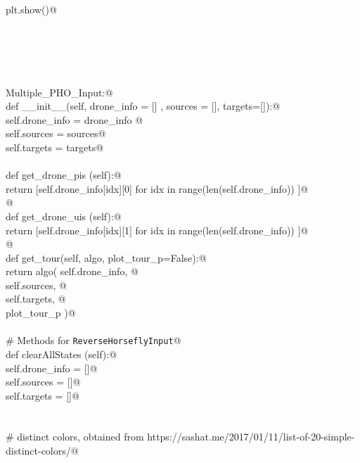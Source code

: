 \documentclass[10pt, english, oneside]{report}
\begin{document}
\begin{appendices}
\begin{flushleft}
\begin{list}{}{}
\mbox{}\verb@    plt.show()@\\
\mbox{}\verb@@\\
\mbox{}\verb@@\\
\mbox{}\verb@@\\
\mbox{}\verb@@\\
\mbox{}\verb@@\\
\mbox{}\verb@class Multiple_PHO_Input:@\\
\mbox{}\verb@    def __init__(self, drone_info = [] , sources = [], targets=[]):@\\
\mbox{}\verb@           self.drone_info = drone_info @\\
\mbox{}\verb@           self.sources     = sources@\\
\mbox{}\verb@           self.targets     = targets@\\
\mbox{}\verb@@\\
\mbox{}\verb@    def get_drone_pis (self):@\\
\mbox{}\verb@           return [self.drone_info[idx][0] for idx in range(len(self.drone_info)) ]@\\
\mbox{}\verb@           @\\
\mbox{}\verb@    def get_drone_uis (self):@\\
\mbox{}\verb@           return [self.drone_info[idx][1] for idx in range(len(self.drone_info)) ]@\\
\mbox{}\verb@         @\\
\mbox{}\verb@    def get_tour(self, algo, plot_tour_p=False):@\\
\mbox{}\verb@           return algo( self.drone_info, @\\
\mbox{}\verb@                        self.sources, @\\
\mbox{}\verb@                        self.targets, @\\
\mbox{}\verb@                        plot_tour_p    )@\\
\mbox{}\verb@@\\
\mbox{}\verb@    # Methods for \verb|ReverseHorseflyInput|@\\
\mbox{}\verb@    def clearAllStates (self):@\\
\mbox{}\verb@          self.drone_info = []@\\
\mbox{}\verb@          self.sources = []@\\
\mbox{}\verb@          self.targets = []@\\
\mbox{}\verb@@\\
\mbox{}\verb@@\\
\mbox{}\verb@# distinct colors, obtained from https://sashat.me/2017/01/11/list-of-20-simple-distinct-colors/@\\

\end{list}
\end{flushleft}
\end{appendices}
\end{document}
